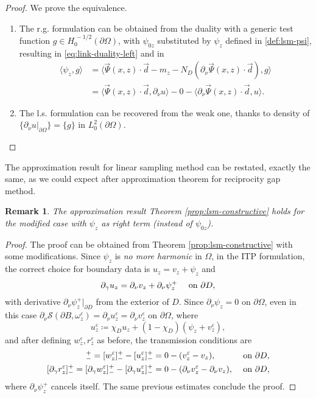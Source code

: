 \documentclass[10pt, a4paper, twoside, openright]{book}
\theoremstyle{definition}
\theoremstyle{plain}
\theoremstyle{plain}
\theoremstyle{plain}
\theoremstyle{plain}
\newtheorem{remark}[subsection]{Remark}
\theoremstyle{plain}
\theoremstyle{plain}
\theoremstyle{plain}
\theoremstyle{plain}
\let\epsilon\varepsilon
\begin{document}
\begin{proof} We prove the equivalence.
\begin{enumerate}
 \item The r.g. formulation can be obtained from the duality with a generic test function $g\in H^{\, -1/2}_0(\partial \Omega)$, with $\psi_{0z}$ substituted by $\psi_z$ defined in \ref{def:lsm-psi}, resulting in \eqref{eq:link-duality-left} and in
\begin{align}
 \langle \psi_z , g \rangle  & = \langle \vec{\Psi}(x,z)\cdot\vec{d} - m_z - {N_D}(\partial_\nu \vec{\Psi}(x,z) \cdot \vec{d}) , g \rangle \\
                             & = \langle \vec{\Psi}(x,z)\cdot\vec{d},\partial_\nu u\rangle - 0 - \langle\partial_\nu \vec{\Psi}(x,z) \cdot \vec{d},u\rangle.
\end{align}
 \item The l.s. formulation can be recovered from the weak one, thanks to density of $\{\partial_\nu u|_{\partial \Omega}\}=\{g\}$ in $L_0^2(\partial \Omega)$.
\qedhere
\end{enumerate}
\end{proof}
The approximation result for linear sampling method can be restated, exactly the same, as we could expect after approximation theorem for reciprocity gap method.
\begin{remark}
 The approximation result Theorem \ref{prop:lsm-constructive} holds for the modified case with $\psi_z$ as right term (instead of $\psi_{0z}$).
\end{remark}
\begin{proof}
 The proof can be obtained from Theorem \ref{prop:lsm-constructive} with some modifications. 
 Since $\psi_z$ is \emph{no more harmonic} in $\Omega$, in the ITP formulation, the correct choice for boundary data is $u_z = v_z + \psi_z$ and
 \begin{equation}
 \partial_\gamma u_z = \partial_\nu v_z + \partial_\nu\psi_z^+ \quad \textup{ on }\partial D,
 \end{equation}
 with derivative $\partial_\nu\psi_z^+|_{\partial D}$ from the exterior of $D$. Since $\partial_\nu\psi_z = 0$ on $\partial \Omega$, even in this case $\partial_\nu\mathcal{S}(\partial B, \omega^\epsilon_z) = \partial_\nu u^\epsilon_z = \partial_\nu v^\epsilon_z$ on $\partial \Omega$, 
 where
 \begin{equation}
   u^\epsilon_z\coloneqq\chi_Du_z + (1-\chi_D)(\psi_{z} + v^\epsilon_z),
 \end{equation}
  and after defining $w^\epsilon_z, r^\epsilon_z$ as before, the transmission conditions are
  \begin{align}
   [r^\epsilon_z]^+_- = [w^\epsilon_z]^+_- -[u^\epsilon_z]^+_- &=0 - (v^\epsilon_z - v_z), && \textup{ on }\partial D, \\
   [\partial_\gamma r^\epsilon_z]^+_- = [\partial_\gamma w^\epsilon_z]^+_- -[\partial_\gamma u^\epsilon_z]^+_-&= 0 - (\partial_\nu v^\epsilon_z - \partial_\nu v_z), && \textup{ on }\partial D, 
  \end{align}
  where $\partial_\nu\psi_z^+$ cancels itself. The same previous estimates conclude the proof.
\end{proof}
\end{document}
